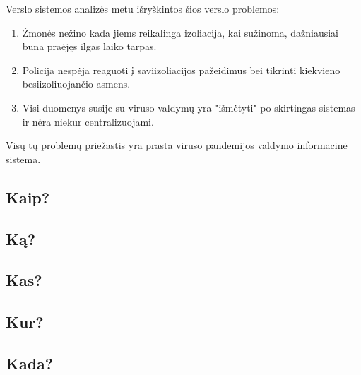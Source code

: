 \documentclass{VUMIFPSkursinis}
\begin{document}
Verslo sistemos analizės metu išryškintos šios verslo problemos:
\begin{enumerate}
	\item Žmonės nežino kada jiems reikalinga izoliacija, kai sužinoma, dažniausiai būna praėjęs ilgas laiko tarpas.
	\item Policija nespėja reaguoti į saviizoliacijos pažeidimus bei tikrinti kiekvieno besiizoliuojančio asmens.
	\item Visi duomenys susije su viruso valdymų yra "išmėtyti" po skirtingas sistemas ir nėra niekur centralizuojami.
\end{enumerate}

Visų tų problemų priežastis yra prasta viruso pandemijos valdymo informacinė sistema.

\subsection{Kaip?}
\subsection{Ką?}
\subsection{Kas?}
\subsection{Kur?}
\subsection{Kada?}
\end{document}
